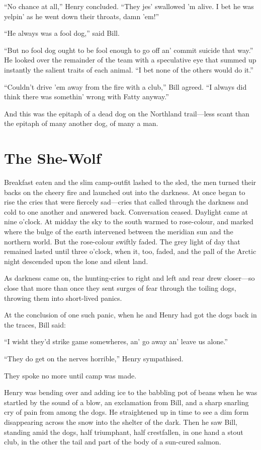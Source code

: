 \documentclass[10pt]{book}
\begin{document}
“No chance at all,” Henry concluded. “They jes’ swallowed ’m alive. I
bet he was yelpin’ as he went down their throats, damn ’em!”

“He always was a fool dog,” said Bill.

“But no fool dog ought to be fool enough to go off an’ commit suicide
that way.” He looked over the remainder of the team with a speculative
eye that summed up instantly the salient traits of each animal. “I bet
none of the others would do it.”

“Couldn’t drive ’em away from the fire with a club,” Bill agreed. “I
always did think there was somethin’ wrong with Fatty anyway.”

And this was the epitaph of a dead dog on the Northland trail—less
scant than the epitaph of many another dog, of many a man.

\chapter{The She-Wolf}

Breakfast eaten and the slim camp-outfit lashed to the sled, the men
turned their backs on the cheery fire and launched out into the
darkness. At once began to rise the cries that were fiercely sad—cries
that called through the darkness and cold to one another and answered
back. Conversation ceased. Daylight came at nine o’clock. At midday the
sky to the south warmed to rose-colour, and marked where the bulge of
the earth intervened between the meridian sun and the northern world.
But the rose-colour swiftly faded. The grey light of day that remained
lasted until three o’clock, when it, too, faded, and the pall of the
Arctic night descended upon the lone and silent land.

As darkness came on, the hunting-cries to right and left and rear drew
closer—so close that more than once they sent surges of fear through
the toiling dogs, throwing them into short-lived panics.

At the conclusion of one such panic, when he and Henry had got the dogs
back in the traces, Bill said:

“I wisht they’d strike game somewheres, an’ go away an’ leave us
alone.”

“They do get on the nerves horrible,” Henry sympathised.

They spoke no more until camp was made.

Henry was bending over and adding ice to the babbling pot of beans when
he was startled by the sound of a blow, an exclamation from Bill, and a
sharp snarling cry of pain from among the dogs. He straightened up in
time to see a dim form disappearing across the snow into the shelter of
the dark. Then he saw Bill, standing amid the dogs, half triumphant,
half crestfallen, in one hand a stout club, in the other the tail and
part of the body of a sun-cured salmon.
\end{document}
